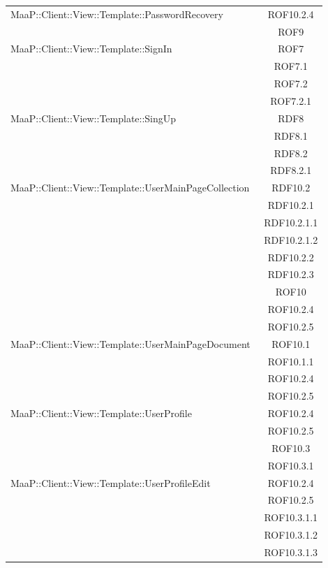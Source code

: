 \begin{center}
\begin{longtable}{|p{0.8\linewidth}|c|}
\midrule
MaaP::Client::View::Template::PasswordRecovery
& ROF10.2.4\\
& ROF9\\

\midrule
MaaP::Client::View::Template::SignIn
& ROF7\\
& ROF7.1\\
& ROF7.2\\
& ROF7.2.1\\

\midrule
MaaP::Client::View::Template::SingUp
& RDF8\\
& RDF8.1\\
& RDF8.2\\
& RDF8.2.1\\

\midrule
MaaP::Client::View::Template::UserMainPageCollection
& RDF10.2\\
& RDF10.2.1\\
& RDF10.2.1.1\\
& RDF10.2.1.2\\
& RDF10.2.2\\
& RDF10.2.3\\
& ROF10\\
& ROF10.2.4\\
& ROF10.2.5\\

\midrule
MaaP::Client::View::Template::UserMainPageDocument
& ROF10.1\\
& ROF10.1.1\\
& ROF10.2.4\\
& ROF10.2.5\\

\midrule
MaaP::Client::View::Template::UserProfile
& ROF10.2.4\\
& ROF10.2.5\\
& ROF10.3\\
& ROF10.3.1\\

\midrule
MaaP::Client::View::Template::UserProfileEdit
& ROF10.2.4\\
& ROF10.2.5\\
& ROF10.3.1.1\\
& ROF10.3.1.2\\
& ROF10.3.1.3\\


\end{longtable}
\end{center}
